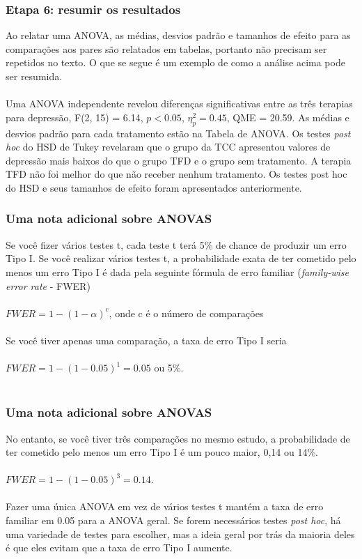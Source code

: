\documentclass[11pt]{beamer}
\begin{document}
\begin{frame}
\frametitle{Etapa 6: resumir os resultados}

Ao relatar uma ANOVA, as médias, desvios padrão e tamanhos de efeito para as comparações aos pares são relatados em tabelas, portanto não precisam ser repetidos no texto. O que se segue é um exemplo de como a análise acima pode ser resumida.\\~\\

Uma ANOVA independente revelou diferenças significativas entre as três terapias para depressão, F(2, 15) = 6.14, $p < 0.05$, $\eta_p^2 = 0.45$, QME = 20.59. As médias e desvios padrão para cada tratamento estão na Tabela de ANOVA. Os testes \textit{post hoc} do HSD de Tukey revelaram que o grupo da TCC apresentou valores de depressão mais baixos do que o grupo TFD e o grupo sem tratamento. A terapia TFD não foi melhor do que não receber nenhum tratamento. Os testes post hoc do HSD e seus tamanhos de efeito foram apresentados anteriormente.

\end{frame}

\begin{frame}
\frametitle{Uma nota adicional sobre ANOVAS}
Se você fizer vários testes t, cada teste t terá 5\% de chance de produzir um erro Tipo I. Se você realizar vários testes t, a probabilidade exata de ter cometido pelo menos um erro Tipo I é dada pela seguinte fórmula de erro familiar (\textit{family-wise error rate} - FWER)\\~\\

$FWER = 1-(1-\alpha)^c$, onde c é o número de comparações\\~\\

Se você tiver apenas uma comparação, a taxa de erro Tipo I seria\\~\\

$FWER = 1 - (1-0.05)^1 = 0.05$ ou 5\%.\\~\\


\end{frame}

\begin{frame}
\frametitle{Uma nota adicional sobre ANOVAS}
No entanto, se você tiver três comparações no mesmo estudo, a probabilidade de ter cometido pelo menos um erro Tipo I é um pouco maior, 0,14 ou 14\%.\\~\\

$FWER = 1 - (1 - 0.05)^3 = 0.14$.\\~\\

Fazer uma única ANOVA em vez de vários testes t mantém a taxa de erro familiar em 0.05 para a ANOVA geral. Se forem necessários testes \textit{post hoc}, há uma variedade de testes para escolher, mas a ideia geral por trás da maioria deles é que eles evitam que a taxa de erro Tipo I aumente.

\end{frame}
\end{document}
